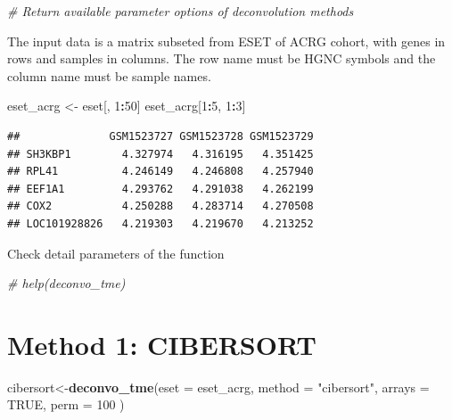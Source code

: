 \documentclass[
  12pt,
]{book}
\newenvironment{Shaded}{\begin{snugshade}}{\end{snugshade}}
\newcommand{\AttributeTok}[1]{\textcolor[rgb]{0.13,0.29,0.53}{#1}}
\newcommand{\CommentTok}[1]{\textcolor[rgb]{0.56,0.35,0.01}{\textit{#1}}}
\newcommand{\ConstantTok}[1]{\textcolor[rgb]{0.56,0.35,0.01}{#1}}
\newcommand{\DecValTok}[1]{\textcolor[rgb]{0.00,0.00,0.81}{#1}}
\newcommand{\FunctionTok}[1]{\textcolor[rgb]{0.13,0.29,0.53}{\textbf{#1}}}
\newcommand{\NormalTok}[1]{#1}
\newcommand{\OtherTok}[1]{\textcolor[rgb]{0.56,0.35,0.01}{#1}}
\newcommand{\SpecialCharTok}[1]{\textcolor[rgb]{0.81,0.36,0.00}{\textbf{#1}}}
\newcommand{\StringTok}[1]{\textcolor[rgb]{0.31,0.60,0.02}{#1}}
\theoremstyle{definition}
\theoremstyle{definition}
\theoremstyle{definition}
\theoremstyle{definition}
\theoremstyle{remark}
\begin{document}
\begin{Shaded}
\begin{Highlighting}[]
\CommentTok{\# Return available parameter options of deconvolution methods}
\end{Highlighting}
\end{Shaded}

The input data is a matrix subseted from ESET of ACRG cohort, with genes in rows and samples in columns. The row name must be HGNC symbols and the column name must be sample names.

\begin{Shaded}
\begin{Highlighting}[]
\NormalTok{eset\_acrg }\OtherTok{\textless{}{-}}\NormalTok{ eset[, }\DecValTok{1}\SpecialCharTok{:}\DecValTok{50}\NormalTok{]}
\NormalTok{eset\_acrg[}\DecValTok{1}\SpecialCharTok{:}\DecValTok{5}\NormalTok{, }\DecValTok{1}\SpecialCharTok{:}\DecValTok{3}\NormalTok{]}
\end{Highlighting}
\end{Shaded}

\begin{verbatim}
##              GSM1523727 GSM1523728 GSM1523729
## SH3KBP1        4.327974   4.316195   4.351425
## RPL41          4.246149   4.246808   4.257940
## EEF1A1         4.293762   4.291038   4.262199
## COX2           4.250288   4.283714   4.270508
## LOC101928826   4.219303   4.219670   4.213252
\end{verbatim}

Check detail parameters of the function

\begin{Shaded}
\begin{Highlighting}[]
\CommentTok{\# help(deconvo\_tme)}
\end{Highlighting}
\end{Shaded}

\hypertarget{method-1-cibersort}{%
\section{Method 1: CIBERSORT}\label{method-1-cibersort}}

\begin{Shaded}
\begin{Highlighting}[]
\NormalTok{cibersort}\OtherTok{\textless{}{-}}\FunctionTok{deconvo\_tme}\NormalTok{(}\AttributeTok{eset =}\NormalTok{ eset\_acrg, }\AttributeTok{method =} \StringTok{"cibersort"}\NormalTok{, }\AttributeTok{arrays =} \ConstantTok{TRUE}\NormalTok{, }\AttributeTok{perm =} \DecValTok{100}\NormalTok{ )}
\end{Highlighting}
\end{Shaded}
\end{document}
